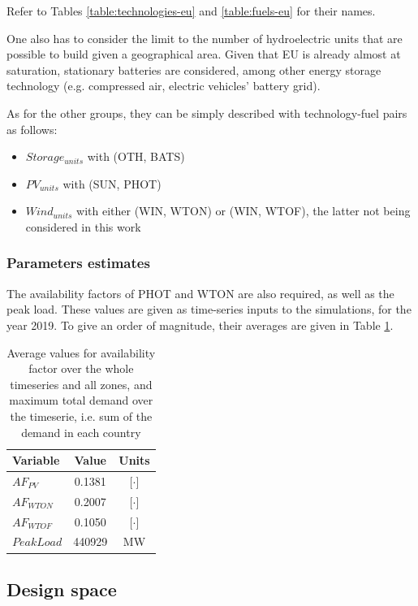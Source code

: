 Refer to Tables \ref{table:technologies-eu} and \ref{table:fuels-eu} for their names.

One also has to consider the limit to the number of hydroelectric units that are possible to build given a geographical area. Given that EU is already almost at saturation, stationary batteries are considered, among other energy storage technology (e.g. compressed air, electric vehicles' battery grid).

As for the other groups, they can be simply described with technology-fuel pairs as follows:
\begin{itemize}
    \item $Storage_{units}$ with (OTH, BATS)
    \item $PV_{units}$ with (SUN, PHOT)
    \item $Wind_{units}$ with either (WIN, WTON) or (WIN, WTOF), the latter not being considered in this work
\end{itemize}

\subsubsection{Parameters estimates}

The availability factors of PHOT and WTON are also required, as well as the peak load. These values are given as time-series inputs to the simulations, for the year 2019. To give an order of magnitude, their averages are given in Table \ref{table:param-values}.


\begin{table}[h]
    \centering
    \begin{tabular}{|l c c|}
        \hline
        Variable     & Value  & Units \\ \hline
        $AF_{PV}$    & 0.1381 & [$\cdot$]    \\
        $AF_{WTON}$  & 0.2007 & [$\cdot$]    \\
        $AF_{WTOF}$  & 0.1050 & [$\cdot$]    \\ 
        $PeakLoad$   & 440929 & MW    \\ \hline
    \end{tabular}
    \caption{Average values for availability factor over the whole timeseries and all zones, and maximum total demand over the timeserie, i.e. sum of the demand in each country}
    \label{table:param-values}
\end{table}

\subsection{Design space}

